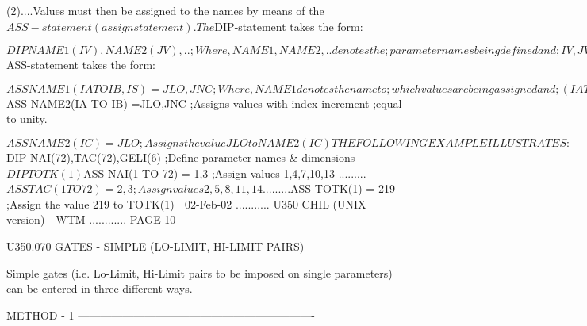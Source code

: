    (2)....Values  must  then  be  assigned  to  the  names  by  means  of  the
          $ASS-statement (assign statement).
 
   The $DIP-statement takes the form:
 
   $DIP NAME1(IV),NAME2(JV),..     ;Where, NAME1, NAME2, .. denotes the
                                   ;parameter names being defined and
                                   ;IV, JV, .. denotes the associated
                                   ;dimension.
 
   The $ASS-statement takes the form:
 
   $ASS NAME1(IA TO IB,IS)=JLO,JNC ;Where, NAME1 denotes the name to
                                   ;which values are being assigned and
                                   ;(IA TO IB,IS) defines a loop on the
                                   ;name index.
 
                                   ;JLO is the first value to assign.
                                   ;JNC is the value-increment to be
                                   ;added for successive assignments.
                                   ;In this case we have:
 
                                   ;NAME1(IA)      = JLO
                                   ;NAME1(IA+IS)   = JLO+JNC
                                   ;NAME1(IA+2*IS) = JLO+2*JNC
 
   $ASS NAME2(IA TO IB)  =JLO,JNC  ;Assigns values with index increment
                                   ;equal to unity.
 
   $ASS NAME2(IC)        =JLO      ;Assigns the value JLO to NAME2(IC)
 
   THE FOLLOWING EXAMPLE ILLUSTRATES:
 
   $DIP NAI(72),TAC(72),GELI(6)    ;Define parameter names & dimensions
   $DIP TOTK(1)
 
   $ASS NAI(1 TO 72) = 1,3         ;Assign values 1,4,7,10,13 .........
   $ASS TAC(1 TO 72) = 2,3         ;Assign values 2,5,8,11,14 .........
   $ASS TOTK(1)      = 219         ;Assign the value 219 to TOTK(1)
    
   02-Feb-02 ........... U350  CHIL (UNIX version) - WTM ............ PAGE  10
 
 
   U350.070  GATES - SIMPLE (LO-LIMIT, HI-LIMIT PAIRS)
 
   Simple gates (i.e.  Lo-Limit,  Hi-Limit  pairs  to  be  imposed  on  single
   parameters) can be entered in three different ways.
 
   METHOD - 1 ----------------------------------------------------------------
 
